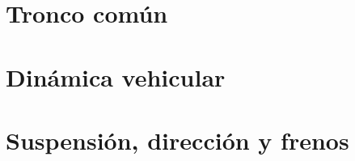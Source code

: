 \documentclass[11pt,a4paper,oneside,openany]{book}
\begin{document}
\frontmatter





\cleardoublepage
\tableofcontents
\cleardoublepage
\listoffigures
\cleardoublepage
\listoftables



\mainmatter

\part{Tronco común}








\part{Dinámica vehicular}









\part{Suspensión, dirección y frenos}








\end{document}
